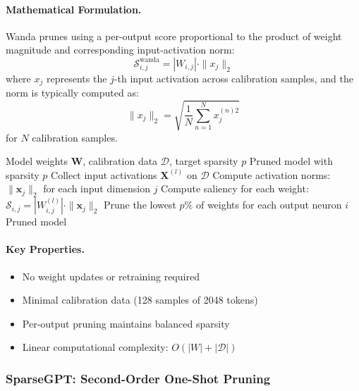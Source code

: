 \paragraph{Mathematical Formulation.}
Wanda prunes using a per-output score proportional to the product of weight magnitude and corresponding input-activation norm:
\begin{equation}
	\mathcal{S}^{\mathrm{wanda}}_{i,j} = |W_{i,j}| \cdot \|x_{j}\|_2
\end{equation}
where $x_j$ represents the $j$-th input activation across calibration samples, and the norm is typically computed as:
\begin{equation}
	\|x_{j}\|_2 = \sqrt{\frac{1}{N}\sum_{n=1}^N x_j^{(n)2}}
\end{equation}
for $N$ calibration samples.

\begin{algorithm}[H]
	\caption{Wanda Pruning}
	\begin{algorithmic}[1]
		\Require Model weights $\mathbf{W}$, calibration data $\mathcal{D}$, target sparsity $p$
		\Ensure Pruned model with sparsity $p$
		\State Collect input activations $\mathbf{X}^{(l)}$ on $\mathcal{D}$
		\State Compute activation norms: $\|\mathbf{x}_j\|_2$ for each input dimension $j$
		\State Compute saliency for each weight: $\mathcal{S}_{i,j} = |W_{i,j}^{(l)}| \cdot \|\mathbf{x}_j\|_2$
		\State Prune the lowest $p\%$ of weights for each output neuron $i$
		\EndFor
		\State \Return Pruned model
	\end{algorithmic}
\end{algorithm}

\paragraph{Key Properties.}
\begin{itemize}[nosep]
	\item No weight updates or retraining required
	\item Minimal calibration data (128 samples of 2048 tokens)
	\item Per-output pruning maintains balanced sparsity
	\item Linear computational complexity: $O(|W| + |\mathcal{D}|)$
\end{itemize}

\subsubsection{SparseGPT: Second-Order One-Shot Pruning}

